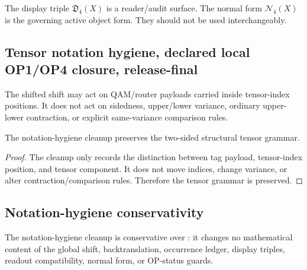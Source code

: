 \begin{remark}
\label{rem:v403-display-triple-versus-normal-form}
The display triple $\mathfrak D_4(X)$ is a reader/audit surface. The normal
form $\mathcal N_4(X)$ is the governing active object form. They should not be
used interchangeably.
\end{remark}

\subsection{Tensor notation hygiene, declared local OP1/OP4 closure, release-final}
\label{subsec:v403-tensor-notation-hygiene}

\begin{definition}
\label{def:v403-tensor-payload-hygiene-rule}
The shifted shift may act on QAM/router payloads carried inside tensor-index
positions. It does not act on sidedness, upper/lower variance, ordinary
upper-lower contraction, or explicit same-variance comparison rules.
\end{definition}

\begin{proposition}
\label{prop:v403-tensor-hygiene-preservation}
The notation-hygiene cleanup preserves the two-sided structural tensor grammar.
\end{proposition}

\begin{proof}
The cleanup only records the distinction between tag payload, tensor-index
position, and tensor component. It does not move indices, change variance, or
alter contraction/comparison rules. Therefore the tensor grammar is preserved.
\end{proof}

\subsection{Notation-hygiene conservativity}
\label{subsec:v403-notation-hygiene-conservativity}

\begin{theorem}
\label{thm:v403-notation-hygiene-conservativity}
The  notation-hygiene cleanup is conservative over : it changes no
mathematical content of the global shift, backtranslation, occurrence ledger,
display triples, readout compatibility, normal form, or OP-status guards.
\end{theorem}

